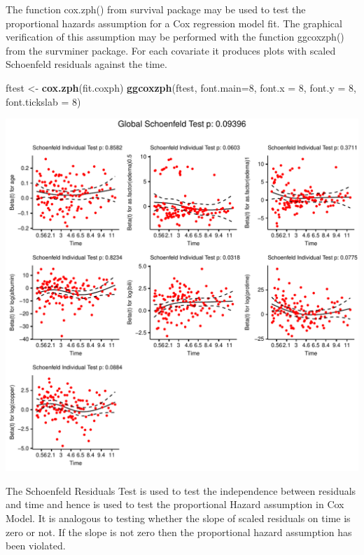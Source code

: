 \documentclass[]{article}
\newenvironment{Shaded}{\begin{snugshade}}{\end{snugshade}}
\newcommand{\KeywordTok}[1]{\textcolor[rgb]{0.13,0.29,0.53}{\textbf{#1}}}
\newcommand{\DataTypeTok}[1]{\textcolor[rgb]{0.13,0.29,0.53}{#1}}
\newcommand{\DecValTok}[1]{\textcolor[rgb]{0.00,0.00,0.81}{#1}}
\newcommand{\StringTok}[1]{\textcolor[rgb]{0.31,0.60,0.02}{#1}}
\newcommand{\NormalTok}[1]{#1}
\begin{document}
The function cox.zph() from survival package may be used to test the
proportional hazards assumption for a Cox regression model fit. The
graphical verification of this assumption may be performed with the
function ggcoxzph() from the survminer package. For each covariate it
produces plots with scaled Schoenfeld residuals against the time.

\begin{Shaded}
\begin{Highlighting}[]
\NormalTok{ftest <-}\StringTok{ }\KeywordTok{cox.zph}\NormalTok{(fit.coxph)}
\KeywordTok{ggcoxzph}\NormalTok{(ftest, }\DataTypeTok{font.main=}\DecValTok{8}\NormalTok{, }\DataTypeTok{font.x =}  \DecValTok{8}\NormalTok{, }\DataTypeTok{font.y =} \DecValTok{8}\NormalTok{, }\DataTypeTok{font.tickslab =} \DecValTok{8}\NormalTok{)}
\end{Highlighting}
\end{Shaded}

\includegraphics{survival_v5_files/figure-latex/unnamed-chunk-37-1.pdf}

The Schoenfeld Residuals Test is used to test the independence between
residuals and time and hence is used to test the proportional Hazard
assumption in Cox Model. It is analogous to testing whether the slope of
scaled residuals on time is zero or not. If the slope is not zero then
the proportional hazard assumption has been violated.
\end{document}
